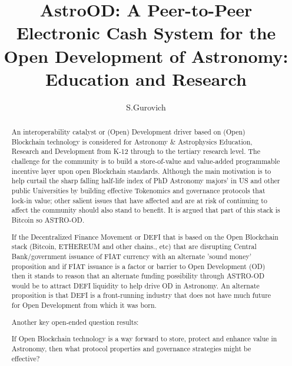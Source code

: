 \documentclass[final,5p,times,twocolumn,authoryear]{elsarticle}
\begin{document}
\begin{frontmatter}

\title{ AstroOD: A Peer-to-Peer Electronic Cash System for the Open Development of Astronomy: Education and Research}
 
    \author[iate,wsu]{S.Gurovich}
  
\address[iate]{
   Instituto De Astronom\'ia Te\'orica y Experimental -
   Observatorio Astron\'omico C\'ordoba (IATE--OAC--UNC--CONICET),
   Laprida 854, X5000BGR, C\'ordoba, Argentina}
\address[wsu]{
   Western Sydney University, Kingswood campus, NSW, Argentina
}

\begin{abstract}

An interoperability catalyst or (Open) Development driver based on (Open) Blockchain technology is considered for Astronomy \& Astrophysics Education, Research and Development from K-12 through to the tertiary research level. The challenge for the community is to build a store-of-value and value-added programmable incentive layer upon open Blockchain standards. Although the main motivation is to help curtail the sharp falling half-life index of PhD Astronomy majors' in US and other public Universities by building effective Tokenomics and governance protocols that lock-in value; other salient issues that have affected and are at risk of continuing to affect the community should also stand to benefit. It is argued that part of this stack is Bitcoin so ASTRO-OD. 

If the Decentralized Finance Movement or DEFI that is based on the Open Blockchain stack (Bitcoin, ETHEREUM and other chains., etc) that are disrupting Central Bank/government issuance of FIAT currency with an alternate 'sound money' proposition and if FIAT issuance is a factor or barrier to Open Development (OD) then it stands to reason that an alternate funding possibility through ASTRO-OD would be to attract DEFI liquidity to help drive OD in Astronomy. An alternate proposition is that DEFI is a front-running industry that does not have much future for Open Development from which it was born.

Another key open-ended question results: 

If Open Blockchain technology is a way forward to store, protect and enhance value in Astronomy, then what protocol properties and governance strategies might be effective?


\end{abstract}
\end{frontmatter}
\end{document}
